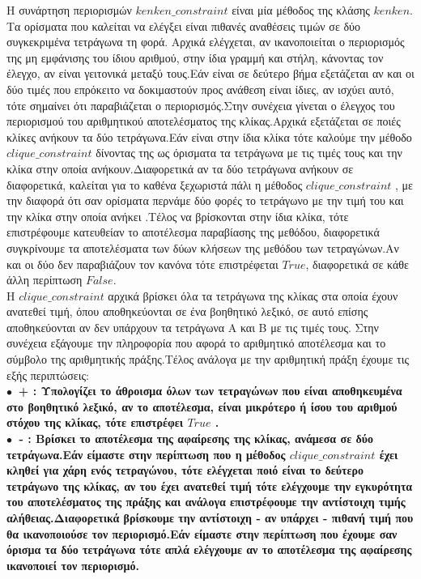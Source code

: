 \documentclass[10pt]{article}
\begin{document}
Η συνάρτηση περιορισμών $kenken\_constraint$ είναι μία μέθοδος της κλάσης $kenken$. Τα ορίσματα που καλείται να ελέγξει είναι πιθανές αναθέσεις τιμών σε δύο συγκεκριμένα τετράγωνα τη φορά. Αρχικά ελέγχεται, αν ικανοποιείται ο περιορισμός της μη εμφάνισης του ίδιου αριθμού, στην ίδια γραμμή και  στήλη, κάνοντας τον έλεγχο, αν είναι γειτονικά μεταξύ τους.Εάν είναι σε δεύτερο βήμα εξετάζεται αν και οι δύο τιμές που επρόκειτο να δοκιμαστούν προς ανάθεση είναι ίδιες, αν ισχύει αυτό, τότε σημαίνει ότι παραβιάζεται ο περιορισμός.Στην συνέχεια γίνεται ο έλεγχος του περιορισμού του αριθμητικού αποτελέσματος της κλίκας.Αρχικά εξετάζεται σε ποιές κλίκες ανήκουν τα δύο τετράγωνα.Εάν είναι στην ίδια κλίκα τότε καλούμε την μέθοδο $ clique\_constraint
$ δίνοντας της ως όρισματα τα τετράγωνα με τις τιμές τους και την κλίκα στην οποία ανήκουν.Διαφορετικά αν τα δύο τετράγωνα ανήκουν σε διαφορετικά, καλείται για το καθένα ξεχωριστά πάλι η μέθοδος $clique\_constraint$ , με την διαφορά ότι σαν ορίσματα περνάμε δύο φορές το τετράγωνο με την τιμή του και την κλίκα στην οποία ανήκει .Τέλος να βρίσκονται στην ίδια κλίκα, τότε επιστρέφουμε κατευθείαν το αποτέλεσμα παραβίασης της μεθόδου, διαφορετικά συγκρίνουμε τα αποτελέσματα των δύων κλήσεων της μεθόδου των τετραγώνων.Αν και οι δύο δεν παραβιάζουν τον κανόνα τότε επιστρέφεται $True$, διαφορετικά σε κάθε άλλη περίπτωση $False$. \\

Η  $clique\_constraint$ αρχικά βρίσκει όλα τα τετράγωνα της κλίκας στα οποία έχουν ανατεθεί τιμή, όπου αποθηκεύονται σε ένα βοηθητικό λεξικό, σε αυτό επίσης αποθηκεύονται αν δεν υπάρχουν τα τετράγωνα Α και Β με τις τιμές τους. Στην συνέχεια εξάγουμε την πληροφορία που αφορά το αριθμητικό αποτέλεσμα και το σύμβολο της αριθμητικής πράξης.Τέλος ανάλογα με την αριθμητική πράξη έχουμε τις εξής περιπτώσεις: \\

$\bullet \ $ \bf + \normalfont: Υπολογίζει το άθροισμα όλων των τετραγώνων που είναι αποθηκευμένα στο βοηθητικό λεξικό, αν το αποτέλεσμα, είναι μικρότερο ή ίσου του αριθμού στόχου της κλίκας, τότε επιστρέφει $True$ . \\

$\bullet \ $ \bf - \normalfont: Βρίσκει το αποτέλεσμα της αφαίρεσης της κλίκας, ανάμεσα σε δύο τετράγωνα.Εάν είμαστε στην περίπτωση που η μέθοδος $clique\_constraint$ έχει κληθεί για χάρη ενός τετραγώνου, τότε ελέγχεται ποιό είναι το δεύτερο τετράγωνο της κλίκας, αν του έχει ανατεθεί τιμή τότε ελέγχουμε την εγκυρότητα του αποτελέσματος της πράξης και ανάλογα επιστρέφουμε την αντίστοιχη τιμής αλήθειας.Διαφορετικά βρίσκουμε την αντίστοιχη - αν υπάρχει - πιθανή τιμή που θα ικανοποιούσε τον περιορισμό.Εάν είμαστε στην περίπτωση που έχουμε σαν όρισμα τα δύο τετράγωνα τότε απλά ελέγχουμε αν το αποτέλεσμα της αφαίρεσης ικανοποιεί τον περιορισμό.\\
\end{document}
